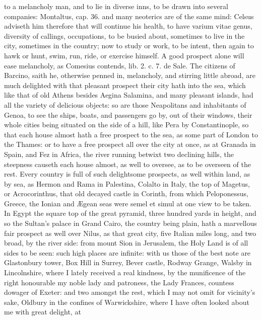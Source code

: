 {to a melancholy man, and to lie in diverse inns, to be drawn into
several companies: Montaltus, cap. 36. and many neoterics are of the
same mind: Celsus adviseth him therefore that will continue his health,
to have varium vitae genus, diversity of callings, occupations, to be
busied about,  sometimes to live in the city, sometimes in the
country; now to study or work, to be intent, then again to hawk or
hunt, swim, run, ride, or exercise himself. A good prospect alone will
ease melancholy, as Comesius contends, lib. 2. c. 7. de Sale. The
citizens of Barcino, saith he, otherwise penned in, melancholy,
and stirring little abroad, are much delighted with that pleasant
prospect their city hath into the sea, which like that of old Athens
besides Aegina Salamina, and many pleasant islands, had all the variety
of delicious objects: so are those Neapolitans and inhabitants of
Genoa, to see the ships, boats, and passengers go by, out of their
windows, their whole cities being situated on the side of a hill, like
Pera by Constantinople, so that each house almost hath a free prospect
to the sea, as some part of London to the Thames: or to have a free
prospect all over the city at once, as at Granada in Spain, and Fez in
Africa, the river running betwixt two declining hills, the steepness
causeth each house almost, as well to oversee, as to be overseen of the
rest. Every country is full of such delightsome prospects, as
well within land, as by sea, as Hermon and Rama in Palestina,
Colalto in Italy, the top of Magetus, or Acrocorinthus, that old
decayed castle in Corinth, from which Peloponessus, Greece, the Ionian
and \AE{}gean seas were semel et simul at one view to be taken. In Egypt
the square top of the great pyramid, three hundred yards in height, and
so the Sultan's palace in Grand Cairo, the country being plain, hath a
marvellous fair prospect as well over Nilus, as that great city, five
Italian miles long, and two broad, by the river side: from mount Sion
in Jerusalem, the Holy Land is of all sides to be seen: such high
places are infinite: with us those of the best note are Glastonbury
tower, Box Hill in Surrey, Bever castle, Rodway Grange, Walsby in
Lincolnshire, where I lately received a real kindness, by the
munificence of the right honourable my noble lady and patroness, the
Lady Frances, countess dowager of Exeter: and two amongst the rest,
which I may not omit for vicinity's sake, Oldbury in the confines of
Warwickshire, where I have often looked about me with great delight, at
}

